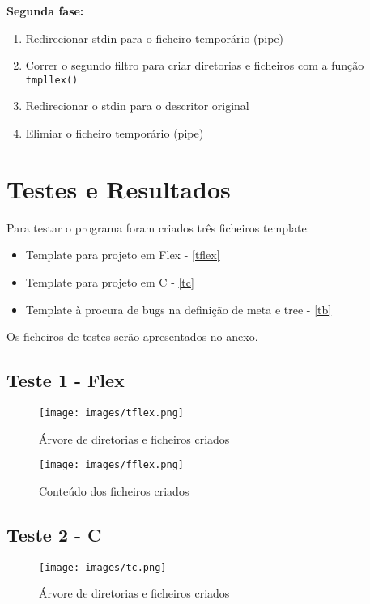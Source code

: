 \documentclass[12pt]{article}
\begin{document}
\textbf{Segunda fase:}
\begin{enumerate}
    \item Redirecionar stdin para o ficheiro temporário (pipe)
    \item Correr o segundo filtro para criar diretorias e ficheiros com a função \texttt{tmpllex()}
    \item Redirecionar o stdin para o descritor original
    \item Elimiar o ficheiro temporário (pipe)
\end{enumerate}


\newpage

\section{Testes e Resultados}

Para testar o programa foram criados três ficheiros template:

\begin{itemize}
    \item Template para projeto em Flex - \ref{tflex}
    \item Template para projeto em C - \ref{tc}
    \item Template à procura de bugs na definição de meta e tree - \ref{tb}
\end{itemize}

Os ficheiros de testes serão apresentados no anexo.

\newpage

\subsection{Teste 1 - Flex}

\begin{figure}[H]
    \centering
    \texttt{[image: images/tflex.png]}
    \caption{Árvore de diretorias e ficheiros criados}
\end{figure}

\begin{figure}[H]
    \centering
    \texttt{[image: images/fflex.png]}
    \caption{Conteúdo dos ficheiros criados}
\end{figure}

\subsection{Teste 2 - C}

\begin{figure}[H]
    \centering
    \texttt{[image: images/tc.png]}
    \caption{Árvore de diretorias e ficheiros criados}
\end{figure}
\end{document}
